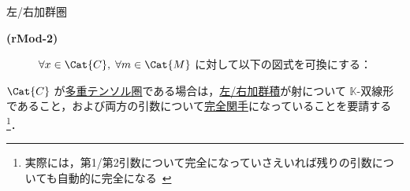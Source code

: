 \documentclass[TQFT_main]{subfiles}
\begin{document}
\begin{mydef}[label=def:modulecat,breakable]{左/右加群圏}
\begin{description}
\begin{center}
        \end{center}
        \item[\textbf{(rMod-2)}] $\forall x \in \Cat{C},\; \forall m \in \Cat{M}$ に対して以下の図式を可換にする：
        \begin{center}
        \end{center}
    \end{description}
    
\end{mydef}

$\Cat{C}$ が\hyperref[def:tensorfusion-cat]{多重テンソル圏}である場合は，\hyperref[def:modulecat]{左/右加群積}が射について $\mathbb{K}$-双線形であること，および両方の引数について\hyperref[def:additive-exact]{完全関手}になっていることを要請する\footnote{実際には，第1/第2引数について完全になっていさえいれば残りの引数についても自動的に完全になる~\cite[EXERCISE7.3.2, p.135]{etingof2015tensor}}．
\end{document}
